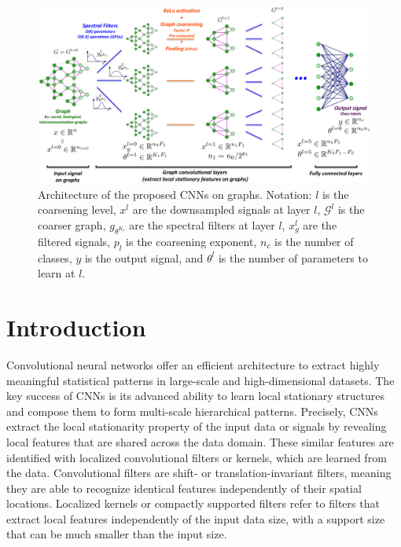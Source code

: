 \documentclass{article}
\newcommand{\G}{\mathcal{G}}
\begin{document}

\begin{figure}[h!]
\centering
\includegraphics[width=\textwidth]{images/illustrationCNNgraphs.eps}
\caption{Architecture of the proposed CNNs on graphs. Notation: $l$ is the
coarsening level, $x^l$ are the downsampled signals at layer $l$, $\G^l$ is the coarser graph, $g_{\theta^{K_l}}$ are the spectral filters at layer $l$, $x_g^l$ are the filtered signals, $p_l$ is the coarsening exponent, $n_c$ is the number of classes, $y$ is the output signal, and $\theta^l$ is the number of parameters to learn at $l$.}
\label{fig_illustration}
\end{figure}

\section{Introduction}

Convolutional neural networks \cite{pro:LeCunBottouBengioHaffner98MNIST}
offer an efficient architecture to extract highly meaningful statistical
patterns in large-scale and high-dimensional datasets. The key success of CNNs
is its advanced ability to learn local stationary structures and compose them to
form multi-scale hierarchical patterns. Precisely, CNNs extract the local
stationarity property of the input data or signals by revealing local features
that are shared across the data domain. These similar features are identified
with localized convolutional filters or kernels, which are learned from the
data. Convolutional filters are shift- or translation-invariant filters, meaning
they are able to recognize identical features independently of their spatial
locations. Localized kernels or compactly supported filters refer to filters
that extract local features independently of the input data size, with a support
size that can be much smaller than the input size.
\end{document}
